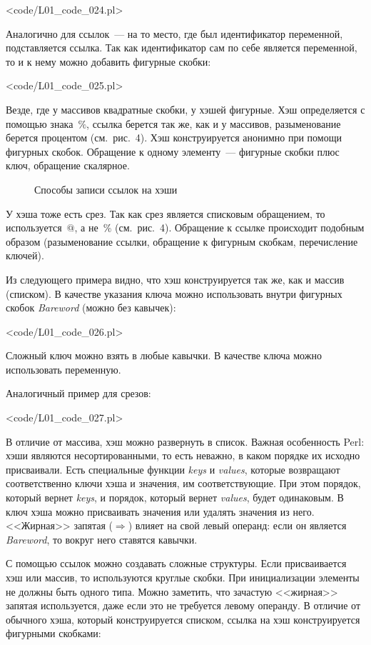 \pr<code/L01_code_024.pl>

Аналогично для ссылок~--- на то место, где был идентификатор переменной, подставляется ссылка.
Так как идентификатор сам по себе является переменной, то и к нему можно добавить фигурные скобки:

\pr<code/L01_code_025.pl>

Везде, где у массивов квадратные скобки, у хэшей фигурные.
Хэш определяется с помощью знака~$\%$, ссылка берется так же, как и у массивов, разыменование берется процентом (см.~рис.~4).
Хэш конструируется анонимно при помощи фигурных скобок.
Обращение к одному элементу~--- фигурные скобки плюс ключ, обращение скалярное.

\begin{figure}[h!]\center
	
	\caption{Способы записи ссылок на хэши}
\end{figure}

У хэша тоже есть срез.
Так как срез является списковым обращением, то используется~$@$, а не~$\%$ (см.~рис.~4).
Обращение к ссылке происходит подобным образом (разыменование ссылки, обращение к фигурным скобкам, перечисление ключей).

Из следующего примера видно, что хэш конструируется так же, как и массив (списком).
В качестве указания ключа можно использовать внутри фигурных скобок \textit{Bareword} (можно без кавычек):

\pr<code/L01_code_026.pl>

Сложный ключ можно взять в любые кавычки.
В качестве ключа можно использовать переменную.

Аналогичный пример для срезов:

\pr<code/L01_code_027.pl>

В отличие от массива, хэш можно развернуть в список.
Важная особенность Perl: хэши являются несортированными, то есть неважно, в каком порядке их исходно присваивали.
Есть специальные функции \textit{keys} и \textit{values}, которые возвращают соответственно ключи хэша и значения, им соответствующие.
При этом порядок, который вернет \textit{keys}, и порядок, который вернет \textit{values}, будет одинаковым.
В ключ хэша можно присваивать значения или удалять значения из него.
<<Жирная>> запятая ($\Rightarrow$) влияет на свой левый операнд: если он является \textit{Bareword}, то вокруг него ставятся кавычки.

С помощью ссылок можно создавать сложные структуры.
Если присваивается хэш или массив, то используются круглые скобки.
При инициализации элементы не должны быть одного типа.
Можно заметить, что зачастую <<жирная>> запятая используется, даже если это не требуется левому операнду.
В отличие от обычного хэша, который конструируется списком, ссылка на хэш конструируется фигурными скобками:

